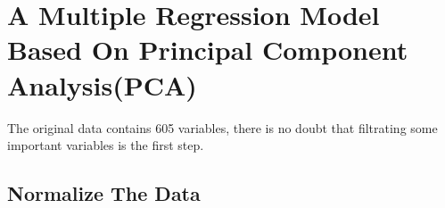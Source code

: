 \documentclass[]{article}
\title{}
\author{}
\begin{document}
\maketitle


\section{A Multiple Regression Model Based On Principal Component Analysis(PCA) }
The original data contains 605 variables,  there is no doubt that filtrating some important variables is the first step.  
\subsection{Normalize The Data}
\end{document}
